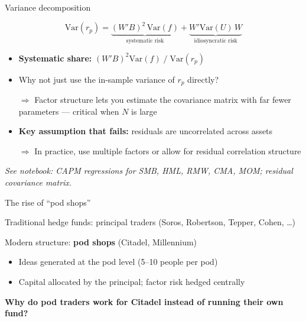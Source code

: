 \documentclass[aspectratio=169,10pt]{beamer}
\begin{document}

\begin{frame}{Variance decomposition}

$$\text{Var}(r_p) = \underbrace{(W' B)^2 \, \text{Var}(f)}_{\text{systematic risk}} + \underbrace{W' \text{Var}(U) \, W}_{\text{idiosyncratic risk}}$$

\vskip 10pt

\begin{itemize}
\item \textbf{Systematic share:} $(W'B)^2 \text{Var}(f) \;/\; \text{Var}(r_p)$
\vskip 6pt
\item Why not just use the in-sample variance of $r_p$ directly?

$\Rightarrow$ Factor structure lets you estimate the covariance matrix with far fewer parameters --- critical when $N$ is large
\vskip 6pt
\item \textbf{Key assumption that fails:} residuals are uncorrelated across assets

$\Rightarrow$ In practice, use multiple factors or allow for residual correlation structure
\end{itemize}

\vskip 5pt

\textit{See notebook: CAPM regressions for SMB, HML, RMW, CMA, MOM; residual covariance matrix.}

\end{frame}


\begin{frame}{The rise of ``pod shops''}

Traditional hedge funds: principal traders (Soros, Robertson, Tepper, Cohen, \ldots)

\vskip 8pt

Modern structure: \textbf{pod shops} (Citadel, Millennium)
\begin{itemize}
\item Ideas generated at the pod level (5--10 people per pod)
\item Capital allocated by the principal; factor risk hedged centrally
\end{itemize}

\vskip 10pt

\textbf{Why do pod traders work for Citadel instead of running their own fund?}

\end{frame}
\end{document}
